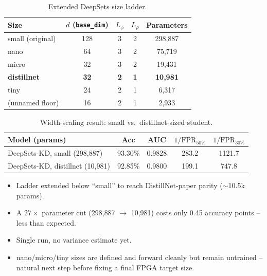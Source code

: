 \begin{table}[h]
    \centering
    \small
    \begin{tabular}{lcccc}
        \toprule
        Size & $d$ (\texttt{base\_dim}) & $L_\phi$ & $L_\rho$ & Parameters \\
        \midrule
        small (original)  & 128 & 3 & 2 & 298{,}887 \\
        nano               & 64  & 3 & 2 &  75{,}719 \\
        micro              & 32  & 3 & 2 &  19{,}431 \\
        \textbf{distillnet} & \textbf{32} & \textbf{2} & \textbf{1} & \textbf{10{,}981} \\
        tiny               & 24  & 2 & 1 &   6{,}317 \\
        (unnamed floor)    & 16  & 2 & 1 &   2{,}933 \\
        \bottomrule
    \end{tabular}
    \caption{Extended DeepSets size ladder.}
    \label{tab:deepsets-size-ladder}
\end{table}

\begin{table}[h]
    \centering
    \small
    \begin{tabular}{lcccc}
        \toprule
        Model (params) & Acc & AUC & $1/\mathrm{FPR}_{50\%}$ & $1/\mathrm{FPR}_{30\%}$ \\
        \midrule
        DeepSets-KD, small (298{,}887) & 93.30\% & 0.9828 & 283.2 & 1121.7 \\
        DeepSets-KD, distillnet (10{,}981) & 92.85\% & 0.9800 & 199.1 & 747.8 \\
        \bottomrule
    \end{tabular}
    \caption{Width-scaling result: small vs.\ distillnet-sized student.}
    \label{tab:deepsets-distillnet-result}
\end{table}

\begin{itemize}
    \item Ladder extended below ``small'' to reach DistillNet-paper
    parity ($\sim$10.5k params).
    \item A $27\times$ parameter cut (298{,}887 $\to$ 10{,}981) costs only
    0.45 accuracy points -- less than expected.
    \item Single run, no variance estimate yet.
    \item nano/micro/tiny sizes are defined and forward cleanly but remain
    untrained -- natural next step before fixing a final FPGA target size.
\end{itemize}

